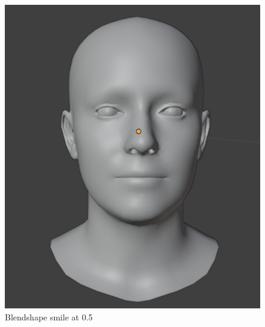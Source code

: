\begin{subfigure}{0.33\linewidth}
  \includegraphics[width=\linewidth]{images/background_work/blendshapes_example/blendshapes_example_1.png}
  \caption{Blendshape smile at 0.5}
\end{subfigure}
\hfill
